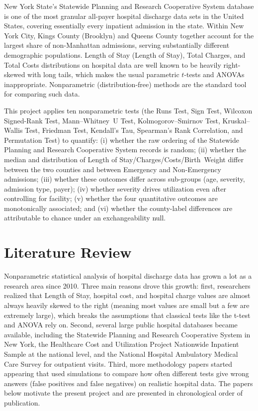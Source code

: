 \documentclass[12pt]{article}
\begin{document}
New York State's Statewide Planning and Research Cooperative System database is one of the most granular all-payer
hospital discharge data sets in the United States, covering essentially
every inpatient admission in the state. Within New York City, Kings
County (Brooklyn) and Queens County together account for the largest
share of non-Manhattan admissions, serving substantially different
demographic populations. Length of Stay (Length of Stay), Total Charges, and Total
Costs distributions on hospital data are well known to be heavily
right-skewed with long tails, which makes the usual parametric $t$-tests
and ANOVAs inappropriate. Nonparametric (distribution-free) methods are
the standard tool for comparing such data.

This project applies ten nonparametric tests (the Runs Test, Sign Test,
Wilcoxon Signed-Rank Test, Mann--Whitney~U Test, Kolmogorov--Smirnov
Test, Kruskal--Wallis Test, Friedman Test, Kendall's Tau, Spearman's
Rank Correlation, and Permutation Test) to quantify:
(i) whether the raw ordering of the Statewide Planning and Research Cooperative System records is random; (ii)
whether the median and distribution of Length of Stay/Charges/Costs/Birth~Weight
differ between the two counties and between Emergency and Non-Emergency
admissions; (iii) whether these outcomes differ across sub-groups (age,
severity, admission type, payer); (iv) whether severity drives
utilization even after controlling for facility; (v) whether the four
quantitative outcomes are monotonically associated; and (vi) whether the
county-label differences are attributable to chance under an
exchangeability null.

\section{Literature Review}

Nonparametric statistical analysis of hospital discharge data has grown
a lot as a research area since 2010. Three main reasons drove this
growth: first, researchers realized that Length of Stay, hospital cost,
and hospital charge values are almost always heavily skewed to the
right (meaning most values are small but a few are extremely large),
which breaks the assumptions that classical tests like the t-test and
ANOVA rely on. Second, several large public hospital databases became
available, including the Statewide Planning and Research Cooperative
System in New York, the Healthcare Cost and Utilization Project
Nationwide Inpatient Sample at the national level, and the National
Hospital Ambulatory Medical Care Survey for outpatient visits. Third,
more methodology papers started appearing that used simulations to
compare how often different tests give wrong answers (false positives
and false negatives) on realistic hospital data. The papers below
motivate the present project and are presented in chronological order
of publication.
\end{document}
